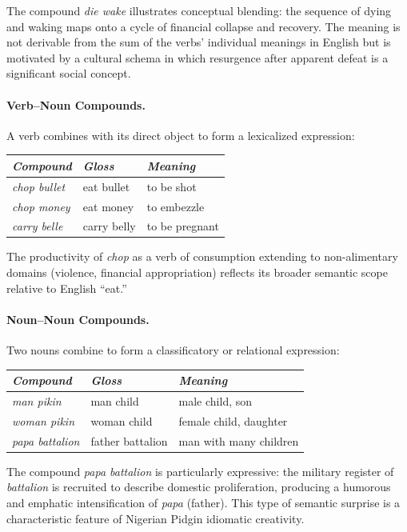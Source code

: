 \documentclass[12pt]{article}
\begin{document}
The compound \textit{die wake} illustrates conceptual blending: the sequence of dying and waking maps onto a cycle of financial collapse and recovery. The meaning is not derivable from the sum of the verbs' individual meanings in English but is motivated by a cultural schema in which resurgence after apparent defeat is a significant social concept.

\paragraph{Verb--Noun Compounds.}
A verb combines with its direct object to form a lexicalized expression:

\begin{center}
\begin{tabular}{lll}
\textit{Compound} & \textit{Gloss} & \textit{Meaning} \\
\hline
\textit{chop bullet} & eat bullet & to be shot \\
\textit{chop money} & eat money & to embezzle \\
\textit{carry belle} & carry belly & to be pregnant \\
\end{tabular}
\end{center}

The productivity of \textit{chop} as a verb of consumption extending to non-alimentary domains (violence, financial appropriation) reflects its broader semantic scope relative to English ``eat.''

\paragraph{Noun--Noun Compounds.}
Two nouns combine to form a classificatory or relational expression:

\begin{center}
\begin{tabular}{lll}
\textit{Compound} & \textit{Gloss} & \textit{Meaning} \\
\hline
\textit{man pikin} & man child & male child, son \\
\textit{woman pikin} & woman child & female child, daughter \\
\textit{papa battalion} & father battalion & man with many children \\
\end{tabular}
\end{center}

The compound \textit{papa battalion} is particularly expressive: the military register of \textit{battalion} is recruited to describe domestic proliferation, producing a humorous and emphatic intensification of \textit{papa} (father). This type of semantic surprise is a characteristic feature of Nigerian Pidgin idiomatic creativity.
\end{document}
